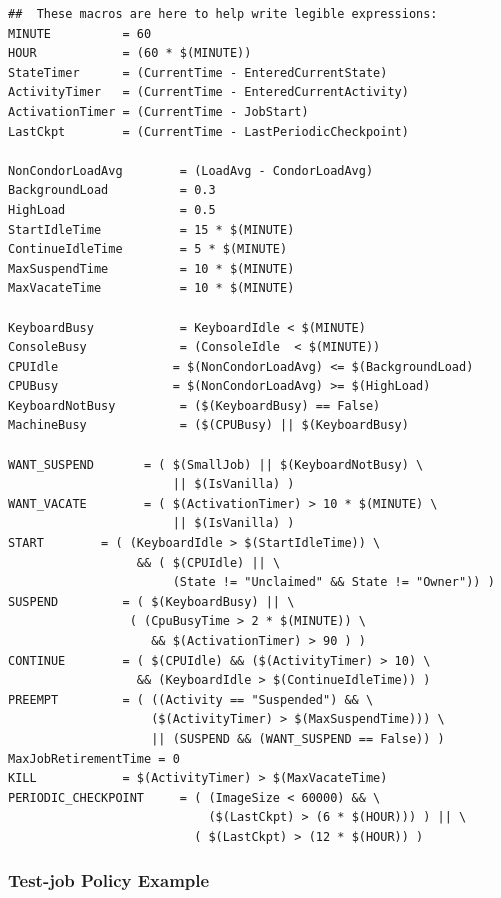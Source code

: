\begin{verbatim}
##  These macros are here to help write legible expressions:
MINUTE          = 60
HOUR            = (60 * $(MINUTE))
StateTimer      = (CurrentTime - EnteredCurrentState)
ActivityTimer   = (CurrentTime - EnteredCurrentActivity)
ActivationTimer = (CurrentTime - JobStart)
LastCkpt        = (CurrentTime - LastPeriodicCheckpoint)

NonCondorLoadAvg        = (LoadAvg - CondorLoadAvg)
BackgroundLoad          = 0.3
HighLoad                = 0.5
StartIdleTime           = 15 * $(MINUTE)
ContinueIdleTime        = 5 * $(MINUTE)
MaxSuspendTime          = 10 * $(MINUTE)
MaxVacateTime           = 10 * $(MINUTE)

KeyboardBusy            = KeyboardIdle < $(MINUTE)
ConsoleBusy             = (ConsoleIdle  < $(MINUTE))
CPUIdle                = $(NonCondorLoadAvg) <= $(BackgroundLoad)
CPUBusy                = $(NonCondorLoadAvg) >= $(HighLoad)
KeyboardNotBusy         = ($(KeyboardBusy) == False)
MachineBusy             = ($(CPUBusy) || $(KeyboardBusy)

WANT_SUSPEND       = ( $(SmallJob) || $(KeyboardNotBusy) \
                       || $(IsVanilla) )
WANT_VACATE        = ( $(ActivationTimer) > 10 * $(MINUTE) \
                       || $(IsVanilla) )
START        = ( (KeyboardIdle > $(StartIdleTime)) \
                  && ( $(CPUIdle) || \
                       (State != "Unclaimed" && State != "Owner")) )
SUSPEND         = ( $(KeyboardBusy) || \
                 ( (CpuBusyTime > 2 * $(MINUTE)) \
                    && $(ActivationTimer) > 90 ) )
CONTINUE        = ( $(CPUIdle) && ($(ActivityTimer) > 10) \
                  && (KeyboardIdle > $(ContinueIdleTime)) )
PREEMPT	        = ( ((Activity == "Suspended") && \
                    ($(ActivityTimer) > $(MaxSuspendTime))) \
                    || (SUSPEND && (WANT_SUSPEND == False)) )
MaxJobRetirementTime = 0
KILL            = $(ActivityTimer) > $(MaxVacateTime)
PERIODIC_CHECKPOINT     = ( (ImageSize < 60000) && \
                            ($(LastCkpt) > (6 * $(HOUR))) ) || \ 
                          ( $(LastCkpt) > (12 * $(HOUR)) )
\end{verbatim}

\subsubsection{\label{sec:Test-job Policy Example}
Test-job Policy Example}


